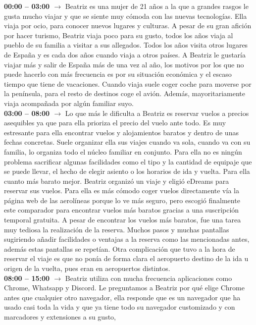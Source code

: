 \noindent\textbf{00:00 -- 03:00 $\rightarrow$} Beatriz es una mujer de 21 años a la que a grandes rasgos le gusta mucho viajar y que se siente muy cómoda con las nuevas tecnologías.
Ella viaja por ocio, para conocer nuevos lugares y culturas. A pesar de su gran afición por hacer turismo, Beatriz viaja poco para su gusto, todos los años viaja al pueblo de su 
familia a visitar a sus allegados. Todos los años visita otros lugares de España y es cada dos años cuando viaja a otros países. A Beatriz le gustaría viajar más y salir de España
más de una vez al año, los motivos por los que no puede hacerlo con más frecuencia es por su situación económica y el escaso tiempo que tiene de vacaciones. Cuando viaja suele 
coger coche para moverse por la península, para el resto de destinos coge el avión. Además, mayoritariamente viaja acompañada por algún familiar suyo. \\
\textbf{03:00 -- 08:00 $\rightarrow$} Lo que más le dificulta a Beatriz es reservar vuelos a precios asequibles ya que para ella prioriza el precio del vuelo ante todo. Es muy 
estresante para ella encontrar vuelos y alojamientos baratos y dentro de unas fechas concretas. Suele organizar ella sus viajes cuando va sola, cuando va con su familia, lo 
organiza todo el núcleo familiar en conjunto. Para ella no es ningún problema sacrificar algunas facilidades como el  tipo y la cantidad de equipaje que se puede llevar, el 
hecho de elegir asiento o los horarios de ida y vuelta. Para ella cuanto más barato mejor. Beatriz organizó un viaje y eligió eDreams para reservar sus vuelos. Para ella es más
cómodo coger vuelos directamente vía la página web de las aerolíneas porque lo ve más seguro, pero escogió finalmente este comparador para encontrar vuelos más baratos gracias
a una suscripción temporal gratuita. A pesar de encontrar los vuelos más baratos, fue una tarea muy tediosa la realización de la reserva. Muchos pasos y muchas pantallas 
sugiriendo añadir facilidades o ventajas a la reserva como las mencionadas antes, además estas pantallas se repetían. Otra complicación que tuvo a la hora de reservar el viaje 
es que no ponía de forma clara el aeropuerto destino de la ida u origen de la vuelta, pues eran en aeropuertos distintos. \\
\textbf{08:00 -- 15:00 $\rightarrow$} Beatriz utiliza con mucha frecuencia aplicaciones como Chrome, Whatsapp y Discord. Le preguntamos a Beatriz por qué elige Chrome antes que
cualquier otro navegador, ella responde que es un navegador que ha usado casi toda la vida y que ya tiene todo su navegador customizado y con marcadores y extensiones a su gusto, 
